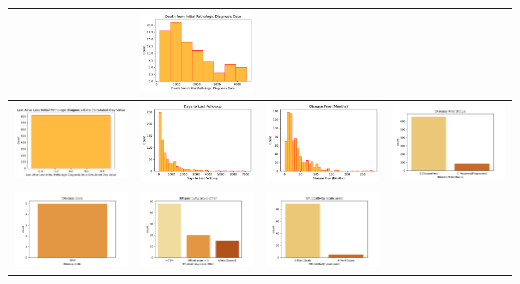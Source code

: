 \begin{table}[!h]
\begin{center}
\begin{tabular}{ |c|c|c|c| }
		& \includegraphics[width=.25\textwidth]{NOTEBOOK/IMAGENES_CRUDAS/16} 
		\\  \hline
		  \includegraphics[width=.25\textwidth]{NOTEBOOK/IMAGENES_CRUDAS/17} 
		& \includegraphics[width=.25\textwidth]{NOTEBOOK/IMAGENES_CRUDAS/18} 
		& \includegraphics[width=.25\textwidth]{NOTEBOOK/IMAGENES_CRUDAS/19} 
		& \includegraphics[width=.25\textwidth]{NOTEBOOK/IMAGENES_CRUDAS/20} 
		\\  \hline
		  \includegraphics[width=.25\textwidth]{NOTEBOOK/IMAGENES_CRUDAS/21} 
		& \includegraphics[width=.25\textwidth]{NOTEBOOK/IMAGENES_CRUDAS/22} 
		& \includegraphics[width=.25\textwidth]{NOTEBOOK/IMAGENES_CRUDAS/23} 

\end{tabular}
\end{center}
\end{table}
